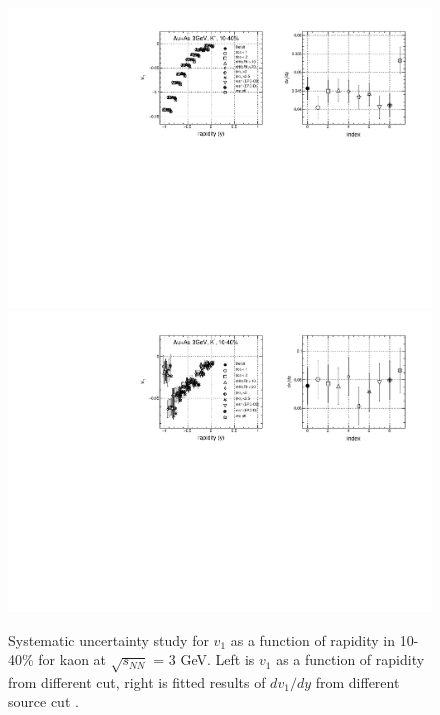 \begin{figure}[h]
\includegraphics[scale=0.5]{chapter3/fig/sys/kaon/v1y_kp_sys.pdf}
\includegraphics[scale=0.5]{chapter3/fig/sys/kaon/v1y_km_sys.pdf}
\caption{Systematic uncertainty study for $v_{1}$ as a function of rapidity in 10-40\% for kaon at $\sqrt{s_{NN}}$ = 3 GeV. Left is $v_{1}$ as a function of rapidity from different cut, right is fitted results of $dv_{1}/dy$ from different source cut .}
\label{pion_v1y_sys}
\end{figure}

